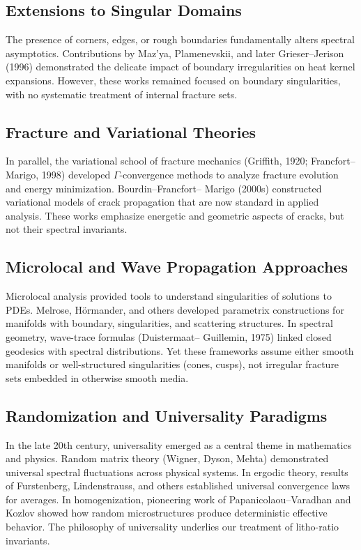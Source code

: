 \subsection*{Extensions to Singular Domains}

The presence of corners, edges, or rough boundaries fundamentally alters
spectral asymptotics. Contributions by Maz’ya, Plamenevskii, and later
Grieser–Jerison (1996) demonstrated the delicate impact of boundary
irregularities on heat kernel expansions. However, these works remained
focused on boundary singularities, with no systematic treatment of
internal fracture sets.

\subsection*{Fracture and Variational Theories}

In parallel, the variational school of fracture mechanics (Griffith,
1920; Francfort–Marigo, 1998) developed $\Gamma$-convergence methods to
analyze fracture evolution and energy minimization. Bourdin–Francfort–
Marigo (2000s) constructed variational models of crack propagation that
are now standard in applied analysis. These works emphasize energetic
and geometric aspects of cracks, but not their spectral invariants.

\subsection*{Microlocal and Wave Propagation Approaches}

Microlocal analysis provided tools to understand singularities of
solutions to PDEs. Melrose, Hörmander, and others developed parametrix
constructions for manifolds with boundary, singularities, and scattering
structures. In spectral geometry, wave-trace formulas (Duistermaat–
Guillemin, 1975) linked closed geodesics with spectral distributions.
Yet these frameworks assume either smooth manifolds or well-structured
singularities (cones, cusps), not irregular fracture sets embedded in
otherwise smooth media.

\subsection*{Randomization and Universality Paradigms}

In the late 20th century, universality emerged as a central theme in
mathematics and physics. Random matrix theory (Wigner, Dyson, Mehta)
demonstrated universal spectral fluctuations across physical systems.
In ergodic theory, results of Furstenberg, Lindenstrauss, and others
established universal convergence laws for averages. In homogenization,
pioneering work of Papanicolaou–Varadhan and Kozlov showed how random
microstructures produce deterministic effective behavior. The philosophy
of universality underlies our treatment of litho-ratio invariants.


